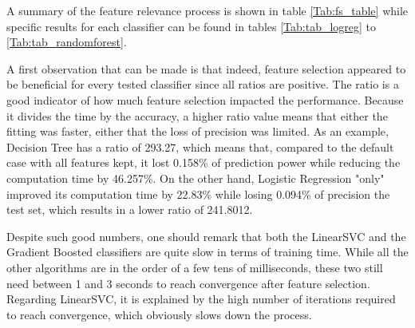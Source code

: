A summary of the feature relevance process is shown in table \ref{Tab:fs_table} while specific results for each classifier can be found in tables \ref{Tab:tab_logreg} to \ref{Tab:tab_randomforest}.

\begin{table}[H]
    \centering
    \caption{Best results for feature selection based on ratio value}
    \label{Tab:fs_table}
\end{table}
A first observation that can be made is that indeed, feature selection appeared to be beneficial for every tested classifier since all ratios are positive. The ratio is a good indicator of how much feature selection impacted the performance. Because it divides the time by the accuracy, a higher ratio value means that either the fitting was faster, either that the loss of precision was limited. As an example, Decision Tree has a ratio of 293.27, which means that, compared to the default case with all features kept, it lost 0.158\% of prediction power while reducing the computation time by 46.257\%. On the other hand, Logistic Regression "only" improved its computation time by 22.83\% while losing 0.094\% of precision the test set, which results in a lower ratio of 241.8012.

Despite such good numbers, one should remark that both the LinearSVC and the Gradient Boosted classifiers are quite slow in terms of training time. While all the other algorithms are in the order of a few tens of milliseconds, these two still need between 1 and 3 seconds to reach convergence after feature selection. Regarding LinearSVC, it is explained by the high number of iterations required to reach convergence, which obviously slows down the process.

